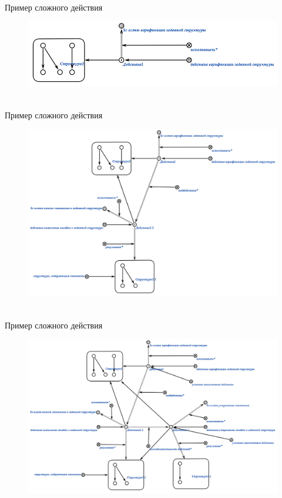 \begin{frame}{\\Пример сложного действия}
	\topline
	\justifying
	\vspace{10mm}
	\begin{SCn}
		\begin{figure}[H]
			\includegraphics[scale=0.6]{./figures/sd_actions/actions1.png}
		\end{figure}
	\end{SCn}
\end{frame}

\begin{frame}{\\Пример сложного действия}
	\topline
	\justifying
	\vspace{10mm}
	\begin{SCn}
		\begin{figure}[H]
			\includegraphics[scale=0.4]{./figures/sd_actions/actions2.png}
		\end{figure}
	\end{SCn}
\end{frame}

\begin{frame}{\\Пример сложного действия}
	\topline
	\justifying
	\vspace{10mm}
	\begin{SCn}
		\begin{figure}[H]
			\includegraphics[scale=0.4]{./figures/sd_actions/actions3.png}
		\end{figure}
	\end{SCn}
\end{frame}